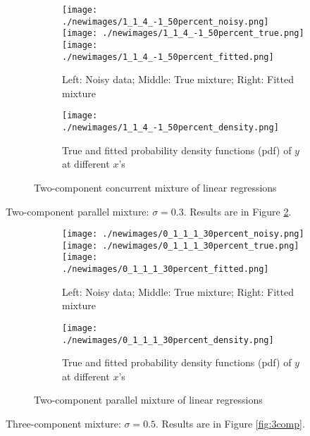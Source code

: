 \documentclass[11pt]{article}
\numberwithin{equation}{section}
\begin{document}
\begin{figure}[!htbp]
\begin{subfigure}[b]{\textwidth}
\texttt{[image: ./newimages/1\_1\_4\_-1\_50percent\_noisy.png]}
\texttt{[image: ./newimages/1\_1\_4\_-1\_50percent\_true.png]}
\texttt{[image: ./newimages/1\_1\_4\_-1\_50percent\_fitted.png]}
\caption{Left: Noisy data; Middle: True mixture; Right: Fitted mixture}
\end{subfigure}
\begin{subfigure}[b]{\textwidth}
\texttt{[image: ./newimages/1\_1\_4\_-1\_50percent\_density.png]}
\caption{True and fitted probability density functions (pdf) of $y$ at different $x$'s }
\end{subfigure}
\caption{Two-component concurrent mixture of linear regressions}
\label{fig:2compcorr}
\end{figure}



 Two-component parallel mixture: $\sigma = 0.3$. Results are in Figure \ref{fig:2comppara}.

\begin{figure}[!htbp]
\begin{subfigure}[b]{\textwidth}
\texttt{[image: ./newimages/0\_1\_1\_1\_30percent\_noisy.png]}
\texttt{[image: ./newimages/0\_1\_1\_1\_30percent\_true.png]}
\texttt{[image: ./newimages/0\_1\_1\_1\_30percent\_fitted.png]}
\caption{Left: Noisy data; Middle: True mixture; Right: Fitted mixture}
\end{subfigure}

\begin{subfigure}[b]{\textwidth}
\texttt{[image: ./newimages/0\_1\_1\_1\_30percent\_density.png]}
\caption{True and fitted probability density functions (pdf) of $y$ at different $x$'s }
\end{subfigure}
\caption{Two-component parallel mixture of linear regressions}
\label{fig:2comppara}
\end{figure}

 Three-component mixture: $\sigma = 0.5$. Results are in Figure \ref{fig:3comp}.
\end{document}

